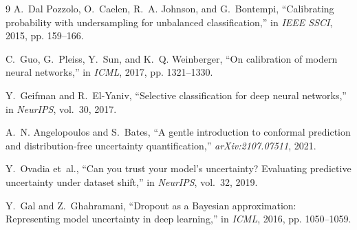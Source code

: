 \documentclass[10pt,a4paper,twocolumn]{article}
\begin{document}
\begin{thebibliography}{9}
  \small
  A.~Dal Pozzolo, O.~Caelen, R.~A. Johnson, and G.~Bontempi,
  \newblock ``Calibrating probability with undersampling for unbalanced classification,''
  \newblock in \emph{IEEE SSCI}, 2015, pp. 159--166.

  C.~Guo, G.~Pleiss, Y.~Sun, and K.~Q. Weinberger,
  \newblock ``On calibration of modern neural networks,''
  \newblock in \emph{ICML}, 2017, pp. 1321--1330.

  Y.~Geifman and R.~El-Yaniv,
  \newblock ``Selective classification for deep neural networks,''
  \newblock in \emph{NeurIPS}, vol.~30, 2017.

  A.~N. Angelopoulos and S.~Bates,
  \newblock ``A gentle introduction to conformal prediction and distribution-free uncertainty quantification,''
  \newblock \emph{arXiv:2107.07511}, 2021.

  Y.~Ovadia et~al.,
  \newblock ``Can you trust your model's uncertainty? Evaluating predictive uncertainty under dataset shift,''
  \newblock in \emph{NeurIPS}, vol.~32, 2019.

  Y.~Gal and Z.~Ghahramani,
  \newblock ``Dropout as a Bayesian approximation: Representing model uncertainty in deep learning,''
  \newblock in \emph{ICML}, 2016, pp. 1050--1059.
\end{thebibliography}
\end{document}
